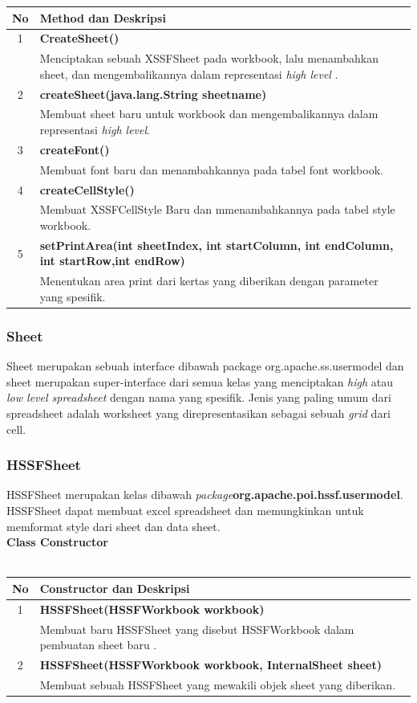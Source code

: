 	\begin{tabular}{|c|p{12cm}|}
		\hline
		\textbf{No} & \textbf{Method dan Deskripsi} \\ \hline \hline
		1 & \textbf{CreateSheet()}\\
			&	Menciptakan sebuah XSSFSheet pada workbook, lalu menambahkan sheet, dan mengembalikannya dalam representasi \textit{high level} .\\ \hline 
		2 & \textbf{createSheet(java.lang.String sheetname)}\\
			&	Membuat sheet baru untuk workbook dan mengembalikannya dalam representasi \textit{high level}.\\ \hline
		3 & \textbf{createFont()}\\
			&	Membuat font baru dan menambahkannya pada tabel font workbook.\\ \hline 
		4 & \textbf{createCellStyle()}\\
			&	Membuat XSSFCellStyle Baru dan mmenambahkannya pada tabel style workbook.\\ \hline
		5 & \textbf{setPrintArea(int sheetIndex, int startColumn, int endColumn, int startRow,int endRow)}\\
			&	Menentukan area print dari kertas yang diberikan dengan parameter yang spesifik.\\ \hline	
	\end{tabular}
	
	
\subsubsection{Sheet}
Sheet merupakan sebuah interface dibawah package org.apache.ss.usermodel dan sheet merupakan super-interface dari semua kelas yang menciptakan \textit{high} atau \textit{low level spreadsheet} dengan nama yang spesifik. Jenis yang paling umum dari spreadsheet adalah worksheet yang direpresentasikan sebagai sebuah \textit{grid} dari cell.\cite{apachepoi2}

\subsubsection{HSSFSheet}
HSSFSheet merupakan kelas dibawah \textit{package}\textbf{org.apache.poi.hssf.usermodel}. HSSFSheet dapat membuat excel spreadsheet dan memungkinkan untuk memformat style dari sheet dan data sheet.\cite{apachepoi2}
\\
\noindent \textbf{Class Constructor}\\ \\
	\begin{tabular}{|c|p{12cm}|}
		\hline
		\textbf{No} & \textbf{Constructor dan Deskripsi} \\ \hline \hline
		1 & \textbf{HSSFSheet(HSSFWorkbook workbook)}\\
			&	Membuat baru HSSFSheet yang disebut HSSFWorkbook dalam pembuatan sheet baru .\\ \hline 
		2 & \textbf{HSSFSheet(HSSFWorkbook workbook, InternalSheet sheet)}\\
			&	Membuat sebuah HSSFSheet yang mewakili objek sheet yang diberikan.\\ \hline
	\end{tabular}
	
